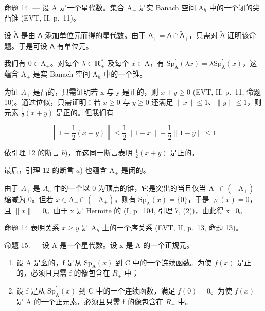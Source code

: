 命题 14. --- 设 A 是一个星代数。集合 \(\mathrm{A}_{+}\) 是实 Banach 空间 \(\mathrm{A}_{h}\) 中的一个闭的尖凸锥 (EVT, II, p.~11)。

设 \(\widetilde{\mathsf{A}}\) 是由 \(\mathsf{A}\) 添加单位元而得的星代数。由于 \(\mathsf{A}_{+} = \mathsf{A} \cap \widetilde{\mathsf{A}}_{+}\)，只需对 \(\widetilde{\mathsf{A}}\) 证明该命题。于是可设 \(\mathsf{A}\) 有单位元。

我们有 \(0 \in \mathrm{A}_{+}\)。对每个 \(\lambda \in \mathbf{R}_{+}^{*}\) 及每个 \(x \in \mathrm{A}\)，有 \(\mathrm{Sp}_{\mathrm{A}}^{\prime}(\lambda x) = \lambda \mathrm{Sp}_{\mathrm{A}}^{\prime}(x)\)，这蕴含 \(\mathrm{A}_{+}\) 是实 Banach 空间 \(\mathrm{A}_{h}\) 中的一个锥。

为证 \(A_{+}\) 是凸的，只需证明若 x 与 y 是正的，则 \(x + y \geqslant 0\) (EVT, II, p.~11, 命题 10)。通过位似，只需证明：若 \(x \geqslant 0\) 与 \(y \geqslant 0\) 还满足 \(\|x\| \leqslant 1\)、\(\|y\| \leqslant 1\)，则元素 \(\frac{1}{2}(x + y)\) 是正的。但我们有

\[
\left\| 1 - \frac {1}{2} (x + y) \right\| \leqslant \frac {1}{2} \| 1 - x \| + \frac {1}{2} \| 1 - y \| \leqslant 1
\]

依引理 12 的断言 \(b)\)，而这同一断言表明 \(\frac{1}{2}(x + y)\) 是正的。

最后，引理 12 的断言 \(a\)) 也蕴含 \(\mathrm{A}_{+}\) 是闭的。

由于 \(A_{+}\) 是 \(A_{h}\) 中的一个以 0 为顶点的锥，它是突出的当且仅当 \(\mathrm{A}_{+}\cap(-\mathrm{A}_{+})\) 缩减为 0。但若 \(x\in\mathrm{A}_{+}\cap(-\mathrm{A}_{+})\)，则有 \(\mathrm{Sp}_{\mathrm{A}}^{\prime}(x)=\{0\}\)，于是 \(\varrho(x)=0\)，且 \(\|x\|=0\)。由于 x 是 Hermite 的 (I, p.~104, 引理 7, (2))，由此得 x=0。

命题 14 表明关系 \(x\geqslant y\) 是 \(\mathrm{A}_h\) 上的一个序关系 (EVT, II, p.~13, 命题 13)。

命题 15. — 设 A 是一个星代数。设 x 是 A 的一个正规元。

\begin{enumerate}
\def\labelenumi{\alph{enumi})}
\item
  设 A 是幺的，f 是从 \(\mathrm{Sp}_{\mathrm{A}}(x)\) 到 C 中的一个连续函数。为使 \(f(x)\) 是正的，必须且只需 f 的像包含在 \(R_{+}\) 中；
\item
  设 f 是从 \(\mathrm{Sp}_{\mathrm{A}}^{\prime}(x)\) 到 C 中的一个连续函数，满足 \(f(0)=0\)。为使 \(f(x)\) 是 A 的一个正元素，必须且只需 f 的像包含在 \(R_{+}\) 中。
\end{enumerate}

